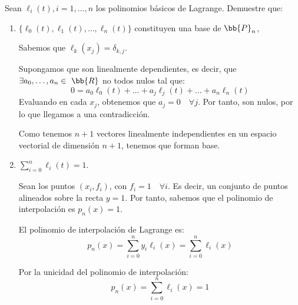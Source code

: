 \begin{ejercicio}
    Sean $\ell_i(t),i=1,\dots,n$ los polinomios básicos de Lagrange. Demuestre que:
    \begin{enumerate}
        \item $\{\ell_0(t),\ell_1(t),\dots, \ell_n(t)\}$ constituyen una base de $\bb{P}_n$,

        Sabemos que $\ell_k(x_j) = \delta_{k,j}$.
        
        Supongamos que son linealmente dependientes, es decir, que $\exists a_0,\dots, a_{n}\in~\bb{R}$ no todos nulos tal que:
        \begin{equation*}
            0 = a_0 \ell_0(t) + \dots + a_j\ell_j(t) + \dots + a_n\ell_n(t)
        \end{equation*}
        Evaluando en cada $x_j$, obtenemos que $a_j=0 \quad \forall j$. Por tanto, son nulos, por lo que llegamos a una contradicción.

        Como tenemos $n+1$ vectores linealmente independientes en un espacio vectorial de dimensión $n+1$, tenemos que forman base.

        \item $\sum_{i=0}^n \ell_i(t)=1$.

        Sean los puntos $(x_i, f_i)$, con $f_i=1\quad \forall i$. Es decir, un conjunto de puntos alineados sobre la recta $y=1$. Por tanto, sabemos que el polinomio de interpolación es $p_n(x)=1$.

        El polinomio de interpolación de Lagrange es:
        \begin{equation*}
            p_n(x) = \sum_{i=0}^ny_i\ell_i(x) = \sum_{i=0}^n \ell_i(x)
        \end{equation*}

        Por la unicidad del polinomio de interpolación:
        \begin{equation*}
            p_n(x) = \sum_{i=0}^n \ell_i(x) = 1
        \end{equation*}
    \end{enumerate}
\end{ejercicio}

